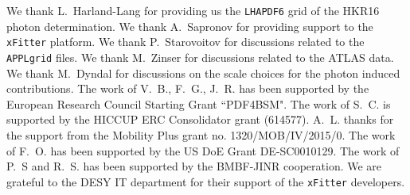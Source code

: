 \acknowledgments
%
We thank L.~Harland-Lang for providing us the {\tt LHAPDF6} grid of
the HKR16 photon determination.
%
We thank A.~Sapronov for providing support to the {\tt xFitter} platform.
%
%
We thank P.~Starovoitov for discussions related to the {\tt APPLgrid} files.
%
We thank M.~Zinser for discussions related to the ATLAS data.
% 
We thank M.~Dyndal for discussions on the scale choices for the photon induced contributions.
%
The work of V.~B., F.~G., J.~R. has been supported by the European
Research Council Starting Grant ``PDF4BSM".
%
The work of S.~C. is supported by the HICCUP ERC Consolidator grant (614577).
%
A.~L. thanks for the support from the Mobility Plus grant no. 1320/MOB/IV/2015/0.
%
The work of F.~O. has been supported by the US DoE Grant DE-SC0010129.
%
%
The work of P.~S and R.~S. has been supported by the BMBF-JINR cooperation.
%
We are grateful to the DESY IT department for their support of the {\tt xFitter} developers. 




